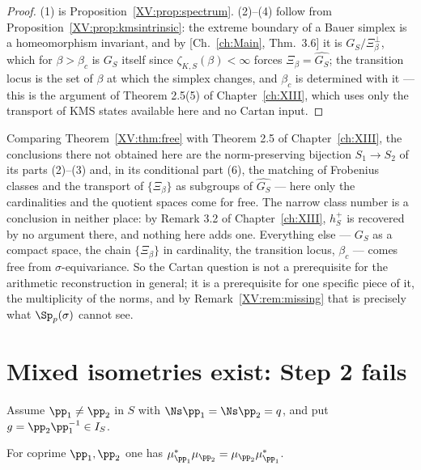 \begin{proof}
(1) is Proposition~\ref{XV:prop:spectrum}. (2)--(4) follow from
Proposition~\ref{XV:prop:kmsintrinsic}: the extreme boundary of a Bauer simplex is a
homeomorphism invariant, and by [Ch.~\ref{ch:Main}, Thm.~3.6] it is $G_S/\Xi_\beta^\perp$, which for
$\beta>\beta_c$ is $G_S$ itself since $\zeta_{K,S}(\beta)<\infty$ forces
$\Xi_\beta=\widehat{G_S}$; the transition locus is the set of $\beta$ at which the simplex
changes, and $\beta_c$ is determined with it --- this is the argument of Theorem 2.5(5) of
Chapter~\ref{ch:XIII}, which uses only the transport of $\mathrm{KMS}$ states available
here and no Cartan input.
\end{proof}

\begin{remark}\label{XV:rem:onlygap}
Comparing Theorem~\ref{XV:thm:free} with Theorem 2.5 of Chapter~\ref{ch:XIII}, the conclusions there not
obtained here are the norm-preserving bijection $S_1\to S_2$ of its parts (2)--(3) and, in
its conditional part (6), the matching of Frobenius classes and the transport of
$\{\Xi_\beta\}$ as subgroups of $\widehat{G_S}$ --- here only the cardinalities and the
quotient spaces come for free. The narrow class number is a conclusion in neither place: by
Remark 3.2 of Chapter~\ref{ch:XIII}, $h^+_S$ is recovered by no argument there, and nothing here adds
one. Everything else --- $G_S$ as a compact space, the chain $\{\Xi_\beta\}$ in cardinality,
the transition locus, $\beta_c$ --- comes free from $\sigma$-equivariance. So the Cartan
question is not a prerequisite for the arithmetic reconstruction in general; it is a
prerequisite for one specific piece of it, the multiplicity of the norms, and by
Remark~\ref{XV:rem:missing} that is precisely what $\Sp_p(\sigma)$ cannot see.
\end{remark}

\section{Mixed isometries exist: Step 2 fails}

Assume $\pp_1\ne\pp_2$ in $S$ with $\Ns\pp_1=\Ns\pp_2=q$, and put $g=\pp_2\pp_1^{-1}\in I_S$.

\begin{lemma}\label{XV:lem:nica}
For coprime $\pp_1,\pp_2$ one has $\mu_{\pp_1}^*\mu_{\pp_2}=\mu_{\pp_2}\mu_{\pp_1}^*$.
\end{lemma}

